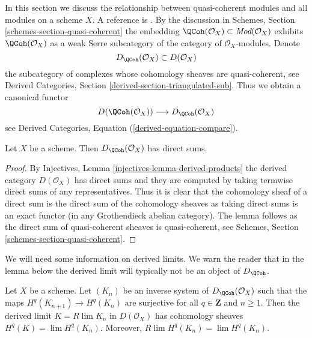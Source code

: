 \noindent
In this section we discuss the relationship between quasi-coherent
modules and all modules on a scheme $X$. A reference is
\cite[Appendix B]{TT}. By the discussion in
Schemes, Section \ref{schemes-section-quasi-coherent}
the embedding
$\QCoh(\mathcal{O}_X) \subset \textit{Mod}(\mathcal{O}_X)$
exhibits $\QCoh(\mathcal{O}_X)$ as a weak Serre subcategory of
the category of $\mathcal{O}_X$-modules. Denote
$$
D_\QCoh(\mathcal{O}_X) \subset D(\mathcal{O}_X)
$$
the subcategory of complexes whose cohomology sheaves are quasi-coherent, see
Derived Categories, Section \ref{derived-section-triangulated-sub}.
Thus we obtain a canonical functor
\begin{equation}
\label{equation-compare}
D(\QCoh(\mathcal{O}_X))
\longrightarrow
D_\QCoh(\mathcal{O}_X)
\end{equation}
see Derived Categories, Equation (\ref{derived-equation-compare}).

\begin{lemma}
\label{lemma-quasi-coherence-direct-sums}
Let $X$ be a scheme. Then $D_\QCoh(\mathcal{O}_X)$
has direct sums.
\end{lemma}

\begin{proof}
By Injectives, Lemma \ref{injectives-lemma-derived-products}
the derived category $D(\mathcal{O}_X)$ has direct sums and
they are computed by taking termwise direct sums of any representatives.
Thus it is clear that the cohomology sheaf of a direct sum is the
direct sum of the cohomology sheaves as taking direct sums is
an exact functor (in any Grothendieck abelian category). The lemma
follows as the direct sum of quasi-coherent sheaves is quasi-coherent, see
Schemes, Section \ref{schemes-section-quasi-coherent}.
\end{proof}

\noindent
We will need some information on derived limits. We warn the reader
that in the lemma below the derived limit will typically not be
an object of $D_\QCoh$.

\begin{lemma}
\label{lemma-Rlim-quasi-coherent}
Let $X$ be a scheme. Let $(K_n)$ be an inverse system of
$D_\QCoh(\mathcal{O}_X)$ such that the maps $H^q(K_{n + 1}) \to H^q(K_n)$
are surjective for all $q \in \mathbf{Z}$ and $n \geq 1$.
Then the derived limit $K = R\lim K_n$ in $D(\mathcal{O}_X)$ has cohomology
sheaves $H^q(K) = \lim H^q(K_n)$. Moreover, $R\lim H^q(K_n) = \lim H^q(K_n)$.
\end{lemma}

